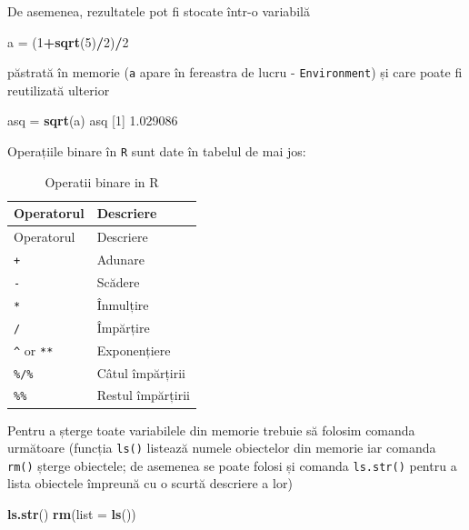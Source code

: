 \documentclass[]{article}
\newenvironment{Shaded}{\begin{snugshade}}{\end{snugshade}}
\newcommand{\DataTypeTok}[1]{\textcolor[rgb]{0.13,0.29,0.53}{#1}}
\newcommand{\DecValTok}[1]{\textcolor[rgb]{0.00,0.00,0.81}{#1}}
\newcommand{\FloatTok}[1]{\textcolor[rgb]{0.00,0.00,0.81}{#1}}
\newcommand{\KeywordTok}[1]{\textcolor[rgb]{0.13,0.29,0.53}{\textbf{#1}}}
\newcommand{\NormalTok}[1]{#1}
\newcommand{\OperatorTok}[1]{\textcolor[rgb]{0.81,0.36,0.00}{\textbf{#1}}}
\newcommand{\StringTok}[1]{\textcolor[rgb]{0.31,0.60,0.02}{#1}}
\begin{document}
De asemenea, rezultatele pot fi stocate într-o variabilă

\begin{Shaded}
\begin{Highlighting}[]
\NormalTok{a =}\StringTok{ }\NormalTok{(}\DecValTok{1}\OperatorTok{+}\KeywordTok{sqrt}\NormalTok{(}\DecValTok{5}\NormalTok{)}\OperatorTok{/}\DecValTok{2}\NormalTok{)}\OperatorTok{/}\DecValTok{2}
\end{Highlighting}
\end{Shaded}

păstrată în memorie (\texttt{a} apare în fereastra de lucru -
\texttt{Environment}) și care poate fi reutilizată ulterior

\begin{Shaded}
\begin{Highlighting}[]
\NormalTok{asq =}\StringTok{ }\KeywordTok{sqrt}\NormalTok{(a)}
\NormalTok{asq}
\NormalTok{[}\DecValTok{1}\NormalTok{] }\FloatTok{1.029086}
\end{Highlighting}
\end{Shaded}

Operațiile binare în \texttt{R} sunt date în tabelul de mai jos:

\begin{longtable}[]{@{}ll@{}}
\caption{Operatii binare in R}\tabularnewline
\toprule
Operatorul & Descriere\tabularnewline
\midrule
\endfirsthead
\toprule
Operatorul & Descriere\tabularnewline
\midrule
\endhead
\texttt{+} & Adunare\tabularnewline
\texttt{-} & Scădere\tabularnewline
\texttt{*} & Înmulțire\tabularnewline
\texttt{/} & Împărțire\tabularnewline
\texttt{\^{}} or \texttt{**} & Exponențiere\tabularnewline
\texttt{\%/\%} & Câtul împărțirii\tabularnewline
\texttt{\%\%} & Restul împărțirii\tabularnewline
\bottomrule
\end{longtable}

Pentru a șterge toate variabilele din memorie trebuie să folosim comanda
următoare (funcția \texttt{ls()} listează numele obiectelor din memorie
iar comanda \texttt{rm()} șterge obiectele; de asemenea se poate folosi
și comanda \texttt{ls.str()} pentru a lista obiectele împreună cu o
scurtă descriere a lor)

\begin{Shaded}
\begin{Highlighting}[]
\KeywordTok{ls.str}\NormalTok{()}
\KeywordTok{rm}\NormalTok{(}\DataTypeTok{list =} \KeywordTok{ls}\NormalTok{())}
\end{Highlighting}
\end{Shaded}
\end{document}
